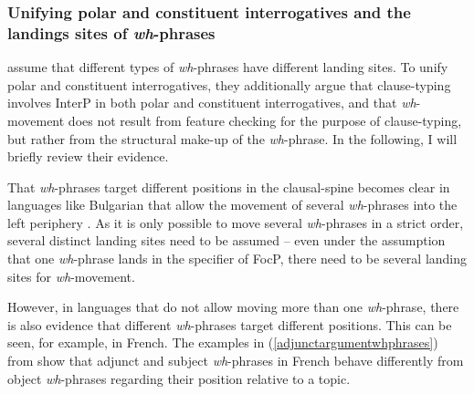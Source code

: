 \subsubsection{Unifying polar and constituent interrogatives and the landings sites of \textit{wh}-phrases}
\citet{aboh2010sa} assume that different types of \textit{wh}-phrases have different landing sites. To unify polar and constituent interrogatives, they additionally argue that clause-typing involves InterP in both polar and constituent interrogatives, and that \textit{wh}-movement does not result from feature checking for the purpose of clause-typing, but rather from the structural make-up of the \textit{wh}-phrase. In the following, I will briefly review their evidence.

That \textit{wh}-phrases target different positions in the clausal-spine becomes clear in languages like Bulgarian that allow the movement of several \textit{wh}-phrases into the left periphery \citep{rudin1988multiple}. As it is only possible to move several \textit{wh}-phrases in a strict order, several distinct landing sites need to be assumed -- even under the assumption that one \textit{wh}-phrase lands in the specifier of FocP, there need to be several landing sites for \textit{wh}-movement.

However, in languages that do not allow moving more than one \textit{wh}-phrase, there is also evidence that different \textit{wh}-phrases target different positions. This can be seen, for example, in French. The examples in (\ref{adjunctargumentwhphrases}) from \citet[101]{aboh2010sa} show that adjunct and subject \textit{wh}-phrases in French behave differently from object \textit{wh}-phrases regarding their position relative to a topic.

